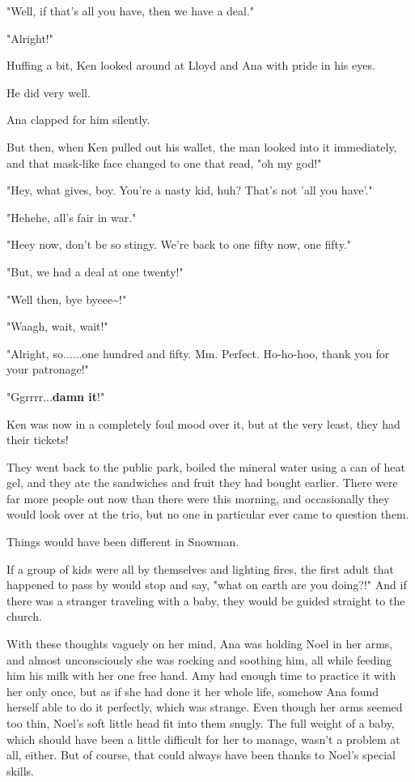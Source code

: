 \documentclass[
]{article}
\begin{document}
"Well, if that's all you have, then we have a deal."

"Alright!"

Huffing a bit, Ken looked around at Lloyd and Ana with pride in his
eyes.

He did very well.

Ana clapped for him silently.

But then, when Ken pulled out his wallet, the man looked into it
immediately, and that mask-like face changed to one that read, "oh my
god!"

"Hey, what gives, boy. You're a nasty kid, huh? That's not 'all you
have'."

"Hehehe, all's fair in war."

"Heey now, don't be so stingy. We're back to one fifty now, one fifty."

"But, we had a deal at one twenty!"

"Well then, bye byeee\textasciitilde!"

"Waagh, wait, wait!"

"Alright, so......one hundred and fifty. Mm. Perfect. Ho-ho-hoo, thank
you for your patronage!"

"Ggrrrr...\textbf{damn it}!"

Ken was now in a completely foul mood over it, but at the very least,
they had their tickets!

They went back to the public park, boiled the mineral water using a can
of heat gel, and they ate the sandwiches and fruit they had bought
earlier. There were far more people out now than there were this
morning, and occasionally they would look over at the trio, but no one
in particular ever came to question them.

Things would have been different in Snowman.

If a group of kids were all by themselves and lighting fires, the first
adult that happened to pass by would stop and say, "what on earth are
you doing?!" And if there was a stranger traveling with a baby, they
would be guided straight to the church.

With these thoughts vaguely on her mind, Ana was holding Noel in her
arms, and almost unconsciously she was rocking and soothing him, all
while feeding him his milk with her one free hand. Amy had enough time
to practice it with her only once, but as if she had done it her whole
life, somehow Ana found herself able to do it perfectly, which was
strange. Even though her arms seemed too thin, Noel's soft little head
fit into them snugly. The full weight of a baby, which should have been
a little difficult for her to manage, wasn't a problem at all, either.
But of course, that could always have been thanks to Noel's special
skills.
\end{document}

